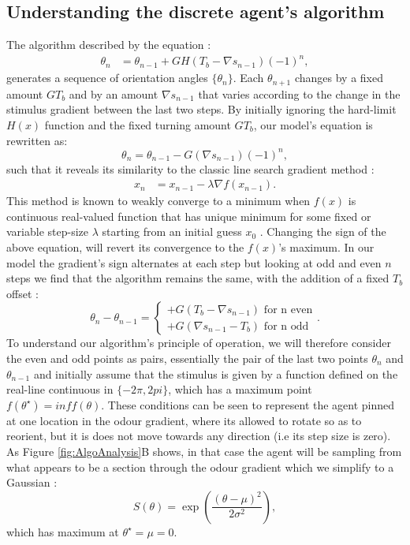 \subsection{Understanding the discrete agent's algorithm}
\label{sec:AlgoExplain}
The algorithm described by the equation :
\begin{align}
\theta_n &= \theta_{n-1} + G H(T_b - \nabla s_{n-1}){(-1)}^n,
\label{eqn:Discretemodel}
\end{align}
 generates a sequence of orientation angles $\{\theta_n\}$. Each $\theta_{n+1}$ changes by a fixed amount $G T_b$ and by an amount $\nabla s_{n-1}$ that varies according to the change in the stimulus gradient between  the last two steps.
By initially ignoring the hard-limit $H(x)$ function  and the fixed turning amount $G T_b$, our model's equation is rewritten as:
\begin{equation}
 \theta_n = \theta_{n-1} - G (\nabla s_{n-1}){(-1)}^n,
\end{equation}
such that it reveals its similarity to the classic line search gradient method :
\begin{align}
x_n &= x_{n-1} - \lambda \nabla f(x_{n-1}).
\label{eqn:graddescent}
\end{align}
This method is known to weakly converge to a minimum when $f(x)$ is continuous real-valued function that has unique minimum for some fixed or variable step-size $\lambda$ starting from an initial guess $x_0$ \citep{armijo1966minimization}. Changing the sign of the above equation, will revert its convergence to the $f(x)$'s maximum. In our model the gradient's sign alternates at each step but looking at odd and even $n$ steps we find that the algorithm remains the same, with the addition of a fixed $T_b$ offset :
\begin{equation}
\theta_n - \theta_{n-1} = 
\begin{cases}
+G (T_b - \nabla s_{n-1}) \mbox { for n even}\\
+G (\nabla s_{n-1}-T_b) \mbox { for n odd}
\end{cases}.
\label{eq:oddevenPairs}
\end{equation}
 To understand our algorithm's principle of operation, we will therefore consider the even and odd points as pairs, essentially the pair of the last two points $\theta_n$ and $\theta_{n-1}$ and  initially assume that the stimulus is given by a function defined on the real-line continuous in $\{-2 \pi , 2 pi\}$, which has a maximum point $f(\theta^\star)=inf f(\theta)$.
  These conditions can be seen to represent the agent pinned at one location in the odour gradient, where its allowed to rotate so as to reorient, but it is does not move towards any direction (i.e its step size is zero). As Figure \ref{fig:AlgoAnalysis}B shows, in that case the agent will be sampling from what appears to be a section through the odour gradient which we simplify to a Gaussian :
\begin{equation}
S(\theta) = \exp\left({\frac{(\theta-\mu)^2}{2 \sigma^2}}\right),
\end{equation}
which has maximum at $\theta^\star = \mu =0$.

